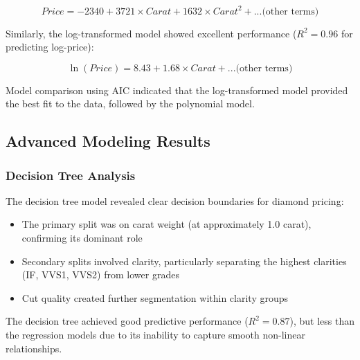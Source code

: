 \documentclass[11pt,a4paper]{article}
\begin{document}
\begin{equation}
Price = -2340 + 3721 \times Carat + 1632 \times Carat^2 + ... \text{(other terms)}
\end{equation}

Similarly, the log-transformed model showed excellent performance ($R^2 = 0.96$ for predicting log-price):

\begin{equation}
\ln(Price) = 8.43 + 1.68 \times Carat + ... \text{(other terms)}
\end{equation}

Model comparison using AIC indicated that the log-transformed model provided the best fit to the data, followed by the polynomial model.

\subsection{Advanced Modeling Results}

\subsubsection{Decision Tree Analysis}

The decision tree model revealed clear decision boundaries for diamond pricing:

\begin{itemize}
    \item The primary split was on carat weight (at approximately 1.0 carat), confirming its dominant role
    \item Secondary splits involved clarity, particularly separating the highest clarities (IF, VVS1, VVS2) from lower grades
    \item Cut quality created further segmentation within clarity groups
\end{itemize}

The decision tree achieved good predictive performance ($R^2 = 0.87$), but less than the regression models due to its inability to capture smooth non-linear relationships.
\end{document}
